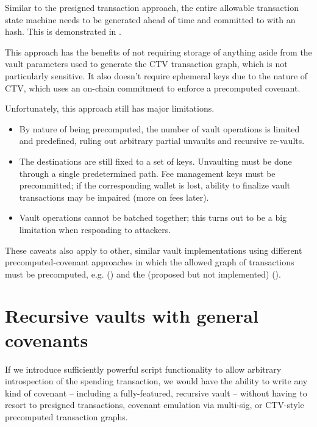 \documentclass[10pt]{article}
\begin{document}
Similar to the presigned transaction approach, the entire allowable transaction
state machine needs to be generated ahead of time and committed to with an \ctv{} hash. 
This is demonstrated in \cite{OBeirne}.

This approach has the benefits of not requiring storage of anything aside from the vault
parameters used to generate the CTV transaction graph, which is not particularly
sensitive. It also doesn't require ephemeral keys due to the nature of CTV, which uses
an on-chain commitment to enforce a precomputed covenant.

Unfortunately, this approach still has major limitations. 

\begin{itemize}

  \item By nature of being precomputed, the number of
    vault operations is limited and predefined, ruling out arbitrary partial
    unvaults and recursive re-vaults. 

  \item The destinations are still fixed to a set of keys. Unvaulting
    must be done through a single predetermined path. Fee management keys must be
    precommitted; if the corresponding wallet is lost, ability to finalize vault 
    transactions may be impaired (more on fees later). 

  \item Vault operations cannot be batched together; this turns out to be a big
    limitation when responding to attackers.

\end{itemize}

These caveats also apply to other, similar vault implementations using different
precomputed-covenant approaches in which the allowed graph of transactions must be
precomputed, e.g.  (\cite{APOVaults}) and the (proposed but not implemented)
 (\cite{OPTX}).

\section*{Recursive vaults with general covenants}

If we introduce sufficiently powerful script functionality to allow arbitrary
introspection of the spending transaction, we would have the ability to write any kind
of covenant -- including a fully-featured, recursive vault -- without having to resort
to presigned transactions, covenant emulation via multi-sig, or CTV-style precomputed
transaction graphs.
\end{document}
